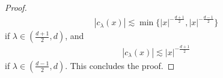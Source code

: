 \documentclass[10pt,a4paper]{amsart}
\begin{document}
\begin{proof}
\begin{align*}
|c_{\lambda}(x)| \lesssim \min\{|x|^{-\frac{d+1}{2}} , |x|^{-\frac{d-1}{2}}\}
\end{align*}
if $\lambda \in (\frac{d+1}{2},d)$, and 
\begin{align*}
|c_{\lambda}(x)| \lesssim |x|^{-\frac{d+1}{2}}
\end{align*}
if $\lambda \in (\frac{d-1}{2},d)$. This concludes the proof.
\end{proof}
\end{document}
